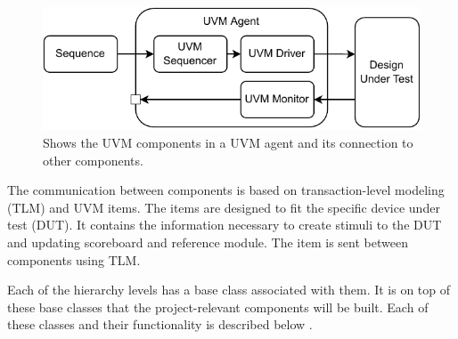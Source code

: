 \begin{figure}[H]
    \centering
    \includegraphics[width=0.6\linewidth]{subfiles/imgs/uvmAgentHierarchy.drawio.pdf}
    \caption{Shows the UVM components in a UVM agent and its connection to other components.}
    \label{fig:uvm_agent}
\end{figure}

The communication between components is based on transaction-level modeling (TLM) and UVM items. The items are designed to fit the specific device under test (DUT). It contains the information necessary to create stimuli to the DUT and updating scoreboard and reference module. The item is sent between components using TLM.

Each of the hierarchy levels has a base class associated with them. It is on top of these base classes that the project-relevant components will be built. Each of these classes and their functionality is described below \cite{uvmUserGuide}. 

